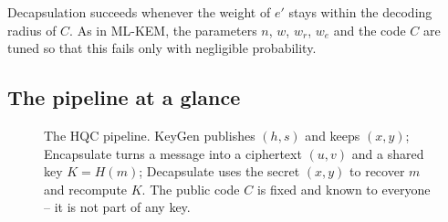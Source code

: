 Decapsulation succeeds whenever the weight of $e'$ stays within the decoding radius of $C$. As in ML-KEM, the parameters $n$, $w$, $w_r$, $w_e$ and the code $C$ are tuned so that this fails only with negligible probability.

\subsection{The pipeline at a glance}

\begin{figure}[H]
\centering
{}
\caption{The HQC pipeline. KeyGen publishes $(h,s)$ and keeps $(x,y)$; Encapsulate turns a message into a ciphertext $(u,v)$ and a shared key $K=H(m)$; Decapsulate uses the secret $(x,y)$ to recover $m$ and recompute $K$. The public code $C$ is fixed and known to everyone -- it is not part of any key.}
\label{fig:hqc-pipeline}
\end{figure}

